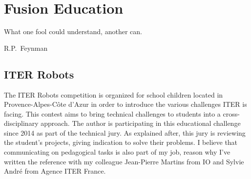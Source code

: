 \setchapterpreamble[u]{\margintoc}
\chapter{Fusion Education}\label{chap:Fusion Education}

\epigraph{What one fool could understand, another can.}{R.P.~Feynman}

\section{ITER Robots}

The ITER Robots competition is organized for school children located in Provence-Alpes-Côte d’Azur in order to introduce the various challenges ITER is facing. This contest aims to bring technical challenges to students into a cross-disciplinary approach. The author is participating in this educational challenge since 2014 as part of the technical jury. As explained after, this jury is reviewing the student's projects, giving indication to solve their problems. I believe that communicating on pedagogical tasks is also part of my job, reason why I've written the reference  with my colleague Jean-Pierre Martins from IO and Sylvie André from Agence ITER France.
 
